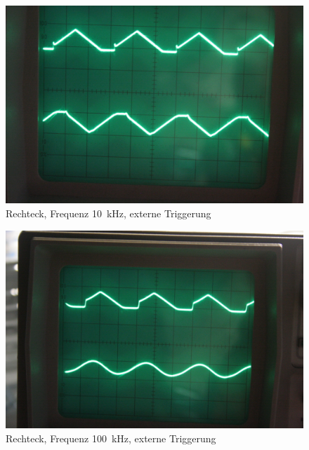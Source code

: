 \begin{figure}
	\centering
	\begin{minipage}{.45\linewidth}
	\end{minipage}
	\hfill
	\begin{minipage}{.45\linewidth}
	\includegraphics[width=\linewidth]{Fotos/IMG_0777-1500.jpg}
	\end{minipage}
	\caption{%
		Rechteck, Frequenz \SI{10}{\kilo\hertz},
		externe Triggerung
	}
	\label{fig:0777}
\end{figure}

\begin{figure}
	\centering
	\begin{minipage}{.45\linewidth}
	\end{minipage}
	\hfill
	\begin{minipage}{.45\linewidth}
	\includegraphics[width=\linewidth]{Fotos/IMG_0778-1500.jpg}
	\end{minipage}
	\caption{%
		Rechteck, Frequenz \SI{100}{\kilo\hertz},
		externe Triggerung
	}
	\label{fig:0778}
\end{figure}

